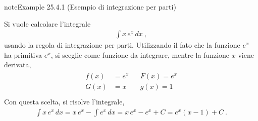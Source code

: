 \documentclass[letterpaper,10pt,italian]{jupyterBook}
\begin{document}
\label{ch/infinitesimal_calculus/integrals:example-6}
\begin{sphinxadmonition}{note}{Example 25.4.1 (Esempio di integrazione per parti)}



\sphinxAtStartPar
Si vuole calcolare l’integrale
\begin{equation*}
\begin{split}\int x \, e^x \, dx \ ,\end{split}
\end{equation*}
\sphinxAtStartPar
usando la regola di integrazione per parti. Utilizzando il fato che la funzione \(e^x\) ha primitiva \(e^x\), si sceglie come funzione da integrare, mentre la funzione \(x\) viene derivata,
\begin{equation*}
\begin{split}\begin{aligned}
  f(x) & = e^x  && F(x) = e^x \\
  G(x) & =   x  && g(x) = 1   \\
\end{aligned}\end{split}
\end{equation*}
\sphinxAtStartPar
Con questa scelta, si risolve l’integrale,
\begin{equation*}
\begin{split}\int x \, e^x \, dx = x \, e^x - \int e^x \, dx = x \, e^x - e^x + C = e^x (x - 1) + C \ .\end{split}
\end{equation*}\end{sphinxadmonition}
\end{document}
